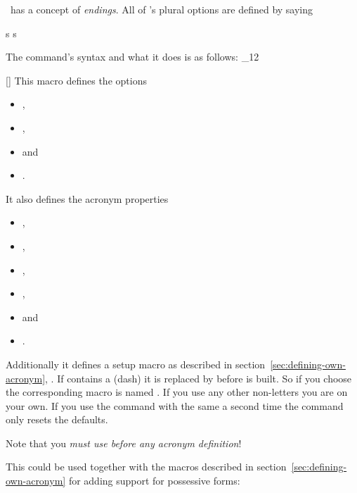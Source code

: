 \documentclass[load-preamble+]{cnltx-doc}
\makeatletter
\renewenvironment{commands}
  {%
    \cnltx@set@catcode_{12}%
    \let\command\cnltx@command
    \cnltxlist
  }
  {\endcnltxlist}
\makeatother
\begin{document}
\acro\ has a concept of \emph{endings}.  All of \acro's plural options are
defined by saying
\begin{sourcecode}
   {s} {s}
\end{sourcecode}
The command's syntax and what it does is as follows:
\begin{commands}
  \command{ProvideAcroEnding}[]
    This macro defines the options
    \begin{itemize}
      \item {},
      \item {},
      \item {} and
      \item {}.
    \end{itemize}
    It also defines the acronym properties
    \begin{itemize}
      \item {},
      \item {},
      \item {},
      \item {},
      \item {} and
      \item {}.
    \end{itemize}
    Additionally it defines a setup macro as
    described in section~\vref{sec:defining-own-acronym},
    .  If  contains a \code{-} (dash) it is
    replaced by \code{\_} before  is built.  So if you
    choose  the corresponding macro is named
    .  If you use any other non-letters you are on your
    own. If you use the command with the same 
    a second time the command only resets the defaults.

    Note that you \emph{must use  before any acronym
      definition}!
\end{commands}

This could be used together with the macros described in
section~\vref{sec:defining-own-acronym} for adding support for possessive
forms:
\end{document}
